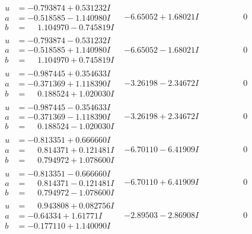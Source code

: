 \documentclass[1p]{elsarticle_modified}
\theoremstyle{definition}
\begin{document}
$$\begin{array}{c|c|c}
\begin{aligned}
u &= -0.793874 + 0.531232 I \\
a &= -0.518585 - 1.140980 I \\
b &= \phantom{-}1.104970 - 0.745819 I\end{aligned}
 & -6.65052 + 1.68021 I & \phantom{-0.000000 } 0 \\ \hline\begin{aligned}
u &= -0.793874 - 0.531232 I \\
a &= -0.518585 + 1.140980 I \\
b &= \phantom{-}1.104970 + 0.745819 I\end{aligned}
 & -6.65052 - 1.68021 I & \phantom{-0.000000 } 0 \\ \hline\begin{aligned}
u &= -0.987445 + 0.354633 I \\
a &= -0.371369 + 1.118390 I \\
b &= \phantom{-}0.188524 + 1.020030 I\end{aligned}
 & -3.26198 - 2.34672 I & \phantom{-0.000000 } 0 \\ \hline\begin{aligned}
u &= -0.987445 - 0.354633 I \\
a &= -0.371369 - 1.118390 I \\
b &= \phantom{-}0.188524 - 1.020030 I\end{aligned}
 & -3.26198 + 2.34672 I & \phantom{-0.000000 } 0 \\ \hline\begin{aligned}
u &= -0.813351 + 0.666660 I \\
a &= \phantom{-}0.814371 + 0.121481 I \\
b &= \phantom{-}0.794972 + 1.078600 I\end{aligned}
 & -6.70110 - 6.41909 I & \phantom{-0.000000 } 0 \\ \hline\begin{aligned}
u &= -0.813351 - 0.666660 I \\
a &= \phantom{-}0.814371 - 0.121481 I \\
b &= \phantom{-}0.794972 - 1.078600 I\end{aligned}
 & -6.70110 + 6.41909 I & \phantom{-0.000000 } 0 \\ \hline\begin{aligned}
u &= \phantom{-}0.943808 + 0.082756 I \\
a &= -0.64334 + 1.61771 I \\
b &= -0.177110 + 1.140090 I\end{aligned}
 & -2.89503 - 2.86908 I & \phantom{-0.000000 } 0 \\ \hline\begin{aligned}

\end{aligned}
\end{array}$$
\end{document}

